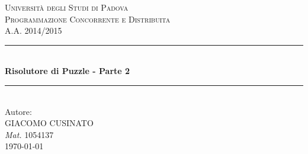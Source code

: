 \documentclass[12pt]{article} %
\begin{document}

	\begin{titlepage}

		\newcommand{\HRule}{\rule{\linewidth}{0.5mm}} %

		\center %

		\textsc{\LARGE Università degli Studi di Padova}\\[1.5cm] %
		\textsc{\Large Programmazione Concorrente e Distribuita}\\[0.5cm] %
		\textsc{\large A.A. 2014/2015}\\[0.5cm] %

		\HRule \\[0.8cm]
		{ \huge \bfseries Risolutore di Puzzle - Parte 2}\\[0.4cm] %
		\HRule \\[1.5cm]


		Autore: \\[\baselineskip]
		{\Large GIACOMO CUSINATO }\\
		{\large \emph{Mat.} 1054137 }\\[4cm] %

		{\large \today}\\[3cm] %

		\vfill %

	\end{titlepage}


	\tableofcontents %

	\newpage %


	
	
	
\end{document}
